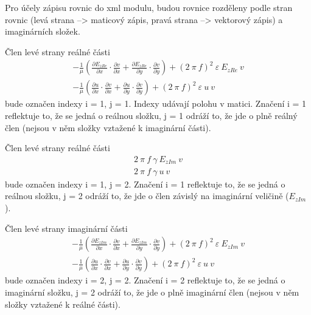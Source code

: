 \documentclass[12pt,a4paper,oneside]{article}
\numberwithin{equation}{section} %
\numberwithin{figure}{section} %
\numberwithin{table}{section} %
\begin{document}
Pro účely zápisu rovnic do xml modulu, budou rovnice rozděleny podle stran rovnic (levá strana --> maticový zápis, pravá strana --> vektorový zápis) a imaginárních složek.

Člen levé strany reálné části
\begin{subequations}
\begin{gather}
- \frac{1}{\mu} \left( \frac{\partial E _{zRe}}{\partial x} \cdot \frac{\partial v}{\partial x} + \frac{\partial E _{zRe}}{\partial y} \cdot \frac{\partial v}{\partial y} \right) + (2 ~ \pi ~ f) ^2 ~ \varepsilon ~ E _{zRe} ~ v
\\
- \frac{1}{\mu} \left( \frac{\partial u}{\partial x} \cdot \frac{\partial v}{\partial x} + \frac{\partial u}{\partial y} \cdot \frac{\partial v}{\partial y} \right) + (2 ~ \pi ~ f) ^2  ~ \varepsilon ~ u ~ v
\end{gather}
\end{subequations}
bude označen indexy i = 1, j = 1. Indexy udávají polohu v matici. Značení i = 1 reflektuje to, že se jedná o reálnou složku, j = 1 odráží to, že jde o plně reálný člen (nejsou v něm složky vztažené k imaginární části). 

Člen levé strany reálné části
\begin{subequations}
\begin{gather}
2 ~ \pi ~ f ~ \gamma ~ E _{zIm} ~ v
\\
2 ~ \pi ~ f ~ \gamma ~ u ~ v
\end{gather}
\end{subequations}
bude označen indexy i = 1, j = 2. Značení i = 1 reflektuje to, že se jedná o reálnou složku, j = 2 odráží to, že jde o člen závislý na imaginární veličině ($E _{zIm}$).


Člen levé strany imaginární části
\begin{subequations}
\begin{gather}
- \frac{1}{\mu} \left( \frac{\partial E _{zIm}}{\partial x} \cdot \frac{\partial v}{\partial x} + \frac{\partial E _{zIm}}{\partial y} \cdot \frac{\partial v}{\partial y} \right) + (2 ~ \pi ~ f) ^2 ~ \varepsilon ~ E _{zIm} ~ v
\\
- \frac{1}{\mu} \left( \frac{\partial u}{\partial x} \cdot \frac{\partial v}{\partial x} + \frac{\partial u}{\partial y} \cdot \frac{\partial v}{\partial y} \right) + (2 ~ \pi ~ f) ^2 ~ \varepsilon ~ u ~ v
\end{gather}
\end{subequations}
bude označen indexy i = 2, j = 2. Značení i = 2 reflektuje to, že se jedná o imaginární složku, j = 2 odráží to, že jde o plně imaginární člen (nejsou v něm složky vztažené k reálné části). 
\end{document}
